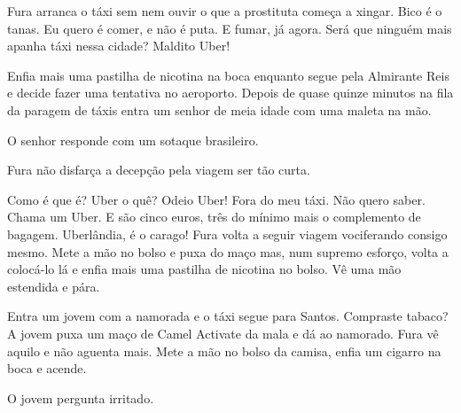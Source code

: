\documentclass[12pt]{creativeWriting}
\begin{document}
Fura arranca o táxi sem nem ouvir o que a prostituta começa a xingar. Bico é o tanas. Eu quero é comer, e não é puta. E fumar, já agora. Será que ninguém mais apanha táxi nessa cidade? Maldito Uber!

Enfia mais uma pastilha de nicotina na boca enquanto segue pela Almirante Reis e decide fazer uma tentativa no aeroporto. Depois de quase quinze minutos na fila da paragem de táxis entra um senhor de meia idade com uma maleta na mão.


 O senhor responde com um sotaque brasileiro.







 Fura não disfarça a decepção pela viagem ser tão curta. 


Como é que é? Uber o quê? Odeio Uber! Fora do meu táxi. Não quero saber. Chama um Uber. E são cinco euros, três do mínimo mais o complemento de bagagem. Uberlândia, é o carago! Fura volta a seguir viagem vociferando consigo mesmo. Mete a mão no bolso e puxa do maço mas, num supremo esforço, volta a colocá-lo lá e enfia mais uma pastilha de nicotina no bolso. Vê uma mão estendida e pára.

Entra um jovem com a namorada e o táxi segue para Santos. Compraste tabaco? A jovem puxa um maço de Camel Activate da mala e dá ao namorado. Fura vê aquilo e não aguenta mais. Mete a mão no bolso da camisa, enfia um cigarro na boca e acende.

 O jovem pergunta irritado. 


\end{document}

